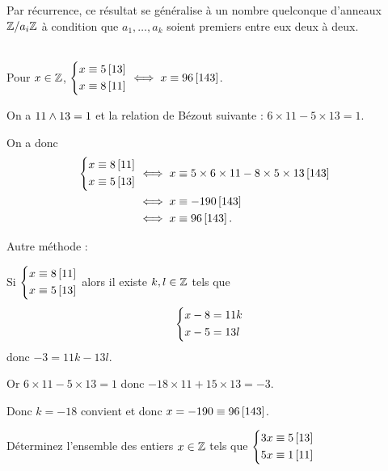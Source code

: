 Par récurrence, ce résultat se généralise à un nombre quelconque d'anneaux \(\mathbb{Z}/a_i\mathbb{Z}\) à condition que \(a_1,\dots,a_k\) soient premiers entre eux deux à deux.

\begin{ex}~\\
Pour \(x\in\mathbb{Z}\), \(\begin{dcases}
x\equiv5\left[13\right] \\
x\equiv8\left[11\right]
\end{dcases}\iff x\equiv96\left[143\right]\).
\end{ex}

\begin{dem}
On a \(11\land13=1\) et la relation de Bézout suivante : \(6\times11-5\times13=1\).

On a donc \[\begin{aligned}
\begin{dcases}
x\equiv8\left[11\right] \\
x\equiv5\left[13\right]
\end{dcases}&\iff x\equiv5\times6\times11-8\times5\times13\left[143\right] \\
&\iff x\equiv-190\left[143\right] \\
&\iff x\equiv96\left[143\right].
\end{aligned}\]

Autre méthode :

Si \(\begin{dcases}
x\equiv8\left[11\right] \\
x\equiv5\left[13\right]
\end{dcases}\) alors il existe \(k,l\in\mathbb{Z}\) tels que \[\begin{dcases}
x-8=11k \\
x-5=13l
\end{dcases}\] donc \(-3=11k-13l\).

Or \(6\times11-5\times13=1\) donc \(-18\times11+15\times13=-3\).

Donc \(k=-18\) convient et donc \(x=-190\equiv96\left[143\right]\).
\end{dem}

\begin{exo}
Déterminez l'ensemble des entiers \(x\in\mathbb{Z}\) tels que \(\begin{dcases}
3x\equiv5\left[13\right] \\
5x\equiv1\left[11\right]
\end{dcases}\)
\end{exo}

